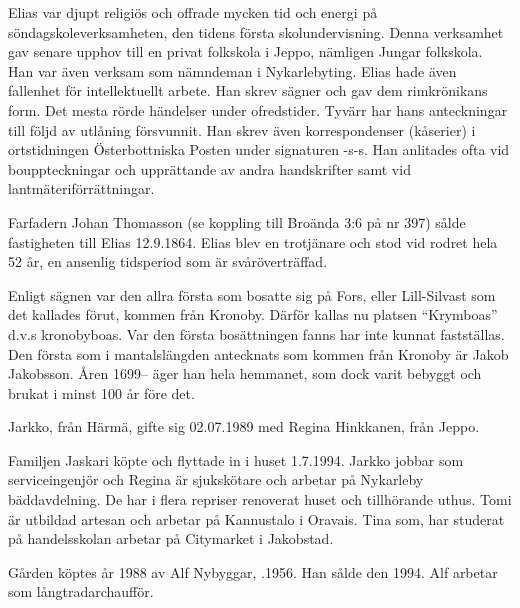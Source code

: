 Elias var djupt religiös och offrade mycken tid och energi på söndagskoleverksamheten, den tidens första skolundervisning. Denna verksamhet gav senare upphov till en privat folkskola i Jeppo, nämligen Jungar folkskola. Han var även verksam som nämndeman i Nykarlebyting. Elias hade även fallenhet för intellektuellt arbete. Han skrev sägner och gav dem rimkrönikans form. Det mesta rörde händelser under ofredstider. Tyvärr har hans anteckningar till följd av utlåning försvunnit. Han skrev även korrespondenser (kåserier) i ortstidningen Österbottniska Posten under signaturen -s-s. Han anlitades  ofta vid bouppteckningar och upprättande av andra handskrifter samt vid lantmäteriförrättningar.

Farfadern Johan Thomasson (se koppling till Broända 3:6 på nr 397) sålde fastigheten till Elias 12.9.1864. Elias blev en trotjänare och stod vid rodret hela 52 år, en ansenlig tidsperiod som är svåröverträffad.

Enligt sägnen var den allra första som bosatte sig på Fors, eller Lill-Silvast som det kallades förut,  kommen från  Kronoby. Därför  kallas nu platsen ``Krymboas'' d.v.s kronobyboas. Var den första bosättningen fanns har inte kunnat fastställas. Den första som i mantalslängden antecknats som kommen från Kronoby är Jakob Jakobsson. Åren 1699-- äger han hela hemmanet, som dock varit bebyggt och brukat i minst 100 år före det.






Jarkko,  från Härmä, gifte sig 02.07.1989 med Regina Hinkkanen,  från Jeppo.
\begin{jhchildren}
  \item {}
  \item {}
\end{jhchildren}

Familjen Jaskari köpte och flyttade in i huset 1.7.1994. Jarkko jobbar som serviceingenjör och Regina är sjukskötare och arbetar på Nykarleby bäddavdelning. De har i flera repriser renoverat huset och tillhörande uthus. Tomi är utbildad artesan och arbetar på Kannustalo i Oravais. Tina som, har studerat på handelsskolan arbetar på Citymarket i Jakobstad.


Gården köptes år 1988 av Alf Nybyggar, .1956. Han sålde den 1994. Alf arbetar som långtradarchaufför.


